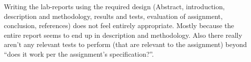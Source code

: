 Writing the lab-reports using the required design (Abstract, introduction, description and methodology, results and tests, evaluation of assignment, conclusion, references) does not feel entirely appropriate.
Mostly because the entire report seems to end up in description and methodology.
Also there really aren't any relevant tests to perform (that are relevant to the assignment) beyond ``does it work per the assignment's specification?''.